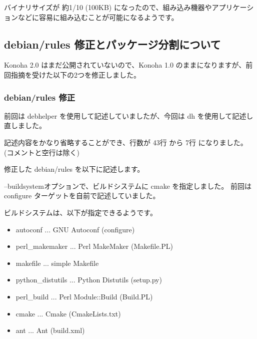 \documentclass[mingoth,a4paper]{jsarticle}
\begin{document}
バイナリサイズが 約1/10 (100KB) になったので、組み込み機器やアプリケーションなどに容易に組み込むことが可能になるようです。

\subsection{debian/rules 修正とパッケージ分割について}
Konoha 2.0 はまだ公開されていないので、Konoha 1.0 のままになりますが、前回指摘を受けた以下の2つを修正しました。

\subsubsection{debian/rules 修正}
前回は debhelper を使用して記述していましたが、今回は dh を使用して記述し直しました。

記述内容をかなり省略することができ、行数が 43行 から 7行 になりました。
(コメントと空行は除く)

修正した debian/rules を以下に記述します。

--buildsystemオプションで、ビルドシステムに cmake を指定しました。
前回は configure ターゲットを自前で記述していました。

ビルドシステムは、以下が指定できるようです。
\begin{itemize}
\item autoconf ... GNU Autoconf (configure)
\item perl\_makemaker ... Perl MakeMaker (Makefile.PL)
\item makefile ... simple Makefile
\item python\_distutils ... Python Distutils (setup.py)
\item perl\_build ... Perl Module::Build (Build.PL)
\item cmake ... Cmake (CmakeLists.txt)
\item ant ... Ant (build.xml)
\end{itemize}
\end{document}
